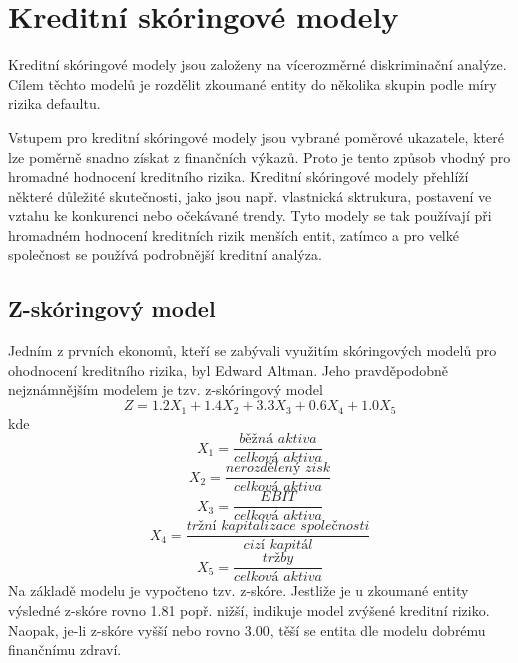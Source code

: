 \documentclass[a4paper]{book}
\begin{document}
\section{Kreditní skóringové modely}

Kreditní skóringové modely jsou založeny na vícerozměrné diskriminační analýze. Cílem těchto modelů je rozdělit zkoumané entity do několika skupin podle míry rizika defaultu.

Vstupem pro kreditní skóringové modely jsou vybrané poměrové ukazatele, které lze poměrně snadno získat z finančních výkazů. Proto je tento způsob vhodný pro hromadné hodnocení kreditního rizika. Kreditní skóringové modely přehlíží některé důležité skutečnosti, jako jsou např. vlastnická sktrukura, postavení ve vztahu ke konkurenci nebo očekávané trendy. Tyto modely se tak používají při hromadném hodnocení kreditních rizik menších entit, zatímco a pro velké společnost se používá podrobnější kreditní analýza.

\subsection{Z-skóringový model}

Jedním z prvních ekonomů, kteří se zabývali využitím skóringových modelů pro ohodnocení kreditního rizika, byl Edward Altman. Jeho pravděpodobně nejznámnějším modelem je tzv. z-skóringový model
\begin{equation*}
Z = 1.2 X_1 + 1.4 X_2 + 3.3 X_3 + 0.6 X_4 + 1.0 X_5
\end{equation*}
kde
\begin{equation*}
X_1 = \frac{\textit{b\v{e}\v{z}n\'{a} aktiva}}{\textit{celkov\'{a} aktiva}}
\end{equation*}
\begin{equation*}
X_2 = \frac{\textit{nerozd\v{e}len\'{y} zisk}}{\textit{celkov\'{a} aktiva}}
\end{equation*}
\begin{equation*}
X_3 = \frac{\textit{EBIT}}{\textit{celkov\'{a} aktiva}}
\end{equation*}
\begin{equation*}
X_4 = \frac{\textit{tr\v{z}n\'{i} kapitalizace spole\v{c}nosti}}{\textit{ciz\'{i} kapitál}}
\end{equation*}
\begin{equation*}
X_5 = \frac{\textit{tr\v{z}by}}{\textit{celkov\'{a} aktiva}}
\end{equation*}
Na základě modelu je vypočteno tzv. z-skóre. Jestliže je u zkoumané entity výsledné z-skóre rovno 1.81 popř. nižší, indikuje model zvýšené kreditní riziko. Naopak, je-li z-skóre vyšší nebo rovno 3.00, těší se entita dle modelu dobrému finančnímu zdraví.
\end{document}
